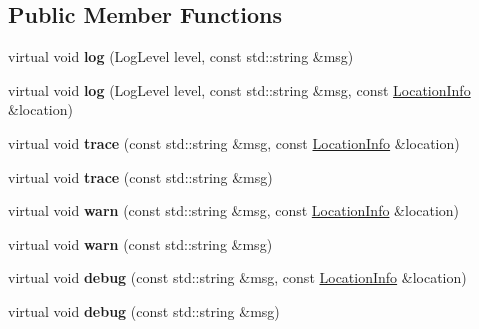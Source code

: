 \subsection*{Public Member Functions}
\begin{DoxyCompactItemize}
\item 
\mbox{\label{classDAQ_1_1Logger_a7ad503476e2820fffb9bfc6bd1179488}} 
virtual void {\bfseries log} (Log\+Level level, const std\+::string \&msg)
\item 
\mbox{\label{classDAQ_1_1Logger_af7ce18f53cdba274c3017030980e773e}} 
virtual void {\bfseries log} (Log\+Level level, const std\+::string \&msg, const \hyperlink{classDAQ_1_1LocationInfo}{Location\+Info} \&location)
\item 
\mbox{\label{classDAQ_1_1Logger_ad56780fd36f54aa382e63f3d4725d2e4}} 
virtual void {\bfseries trace} (const std\+::string \&msg, const \hyperlink{classDAQ_1_1LocationInfo}{Location\+Info} \&location)
\item 
\mbox{\label{classDAQ_1_1Logger_ab5d7027c8f9beb7d812d53460ca6c1cd}} 
virtual void {\bfseries trace} (const std\+::string \&msg)
\item 
\mbox{\label{classDAQ_1_1Logger_aebe8d84fd1f7295bc9b852632fa3ffa3}} 
virtual void {\bfseries warn} (const std\+::string \&msg, const \hyperlink{classDAQ_1_1LocationInfo}{Location\+Info} \&location)
\item 
\mbox{\label{classDAQ_1_1Logger_a395e0926daf3d496260377e2b78d2198}} 
virtual void {\bfseries warn} (const std\+::string \&msg)
\item 
\mbox{\label{classDAQ_1_1Logger_ad2d8b54bea96102c62a1546cceea6d3a}} 
virtual void {\bfseries debug} (const std\+::string \&msg, const \hyperlink{classDAQ_1_1LocationInfo}{Location\+Info} \&location)
\item 
\mbox{\label{classDAQ_1_1Logger_a241fe350f5e93e407aef21bbcf4a0b18}} 
virtual void {\bfseries debug} (const std\+::string \&msg)
\item 
\mbox{\label{classDAQ_1_1Logger_a069091347104829a4cf14504f3860076}} 

\end{DoxyCompactItemize}

